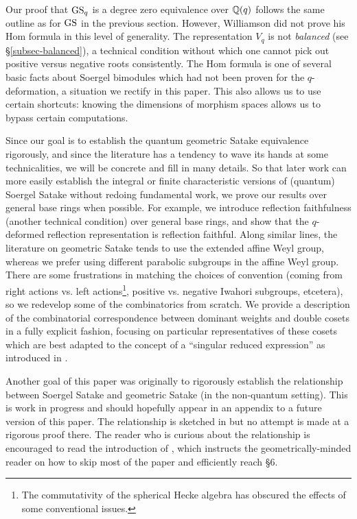 Our proof that $\operatorname{GS}_q$ is a degree zero equivalence over $\mathbb{Q}(q)$ follows the same outline as for $\operatorname{GS}$ in the previous section. However, Williamson did not prove his Hom formula in this level of generality. The representation $V_q$ is not \emph{balanced} (see \S\ref{subsec-balanced}), a technical condition without which one cannot pick out positive versus negative roots consistently. The Hom formula is one of several basic facts about Soergel bimodules which had not been proven for the $q$-deformation, a situation we rectify in this paper. This also allows us to use certain shortcuts: knowing the dimensions of morphism spaces allows us to bypass certain computations. 

Since our goal is to establish the quantum geometric Satake equivalence rigorously, and since the literature has a tendency to wave its hands at some technicalities, we will be concrete and fill in many details. So that later work can more easily establish the integral or finite characteristic versions of (quantum) Soergel Satake without redoing fundamental work, we prove our results over general base rings when possible. For example, we introduce reflection faithfulness (another technical condition) over general base rings, and show that the $q$-deformed reflection representation is reflection faithful. Along similar lines, the literature on geometric Satake tends to use the extended affine Weyl group, whereas we prefer using different parabolic subgroups in the affine Weyl group. There are some frustrations in matching the choices of convention (coming from right actions vs. left actions\footnote{The commutativity of the spherical Hecke algebra has obscured the effects of some conventional issues.}, positive vs. negative Iwahori subgroups, etcetera), so we redevelop some of the combinatorics from scratch. We provide a description of the combinatorial correspondence between dominant weights and double cosets in a fully explicit fashion, focusing on particular representatives of these cosets which are best adapted to the concept of a ``singular reduced expression'' as introduced in \cite{WillThesis, EKo}.

Another goal of this paper was originally to rigorously establish the relationship between Soergel Satake and geometric Satake (in the non-quantum setting). This is work in progress and should hopefully appear in an appendix to a future version of this paper. The relationship is sketched in \cite[\S 6]{EQuantumI} but no attempt is made at a rigorous proof there.  The reader who is curious about the relationship is encouraged to read the introduction of \cite{EQuantumI}, which instructs the geometrically-minded reader on how to skip most of the paper and efficiently reach \S 6.


